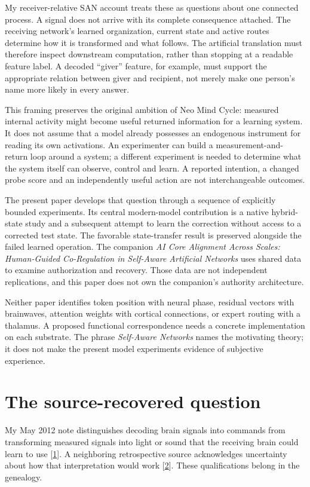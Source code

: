 \documentclass[11pt,letterpaper]{article}
\begin{document}
My receiver-relative SAN account treats these as questions about one connected process. A signal does not arrive with its complete consequence attached. The receiving network's learned organization, current state and active routes determine how it is transformed and what follows. The artificial translation must therefore inspect downstream computation, rather than stopping at a readable feature label. A decoded “giver” feature, for example, must support the appropriate relation between giver and recipient, not merely make one person's name more likely in every answer.

This framing preserves the original ambition of Neo Mind Cycle: measured internal activity might become useful returned information for a learning system. It does not assume that a model already possesses an endogenous instrument for reading its own activations. An experimenter can build a measurement-and-return loop around a system; a different experiment is needed to determine what the system itself can observe, control and learn. A reported intention, a changed probe score and an independently useful action are not interchangeable outcomes.

The present paper develops that question through a sequence of explicitly bounded experiments. Its central modern-model contribution is a native hybrid-state study and a subsequent attempt to learn the correction without access to a corrected test state. The favorable state-transfer result is preserved alongside the failed learned operation. The companion \emph{AI Core Alignment Across Scales: Human-Guided Co-Regulation in Self-Aware Artificial Networks} uses shared data to examine authorization and recovery. Those data are not independent replications, and this paper does not own the companion's authority architecture.

Neither paper identifies token position with neural phase, residual vectors with brainwaves, attention weights with cortical connections, or expert routing with a thalamus. A proposed functional correspondence needs a concrete implementation on each substrate. The phrase \emph{Self-Aware Networks} names the motivating theory; it does not make the present model experiments evidence of subjective experience.

\section{The source-recovered question}

My May 2012 note distinguishes decoding brain signals into commands from transforming measured signals into light or sound that the receiving brain could learn to use [\hyperref[ref:1]{1}]. A neighboring retrospective source acknowledges uncertainty about how that interpretation would work [\hyperref[ref:2]{2}]. These qualifications belong in the genealogy.
\end{document}
